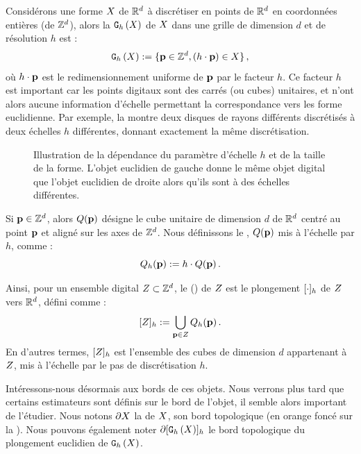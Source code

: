 Considérons une forme $X$ de $\mathbb{R}^d$ à discrétiser en points de $\mathbb{R}^d$ en
coordonnées entières (\cad de $\mathbb{Z}^d$), alors la  $\mathtt{G}_{h}\left(X\right)$ de $X$ dans une grille de dimension $d$ et de résolution $h$
est :
%
\begin{equation}
  \mathtt{G}_{h}\left(X\right) := \{ \mathbf{p} \in \mathbb{Z}^d, (h \cdot \mathbf{p}) \in X \} \,,
\end{equation}
%
où $h \cdot \mathbf{p}$ est le redimensionnement uniforme de $\mathbf{p}$ par le facteur $h$.
Ce facteur $h$ est important car les points digitaux sont des carrés (ou cubes)
unitaires, et n'ont alors aucune information d'échelle permettant la
correspondance vers les forme euclidienne. Par exemple, la
 montre deux disques de rayons différents
discrétisés à deux échelles $h$ différentes, donnant exactement la même
discrétisation.


\begin{figure}[ht]
  \begin{center}
    
  \end{center}
  \caption[Illustration de la dépendance du paramètre d'échelle $h$.]
  {Illustration de la dépendance du paramètre d'échelle $h$ et de la taille de
  la forme. L'objet euclidien de gauche donne le même objet digital que l'objet
  euclidien de droite alors qu'ils sont à des échelles
  différentes.\label{fig:scale-digital}}
\end{figure}

Si $\mathbf{p} \in \mathbb{Z}^d$, alors $Q({\mathbf{p}})$ désigne le cube unitaire de dimension $d$ de
$\mathbb{R}^d$ centré au point $\mathbf{p}$ et aligné sur les axes de $\mathbb{Z}^d$. Nous définissons
le , \cad $Q({\mathbf{p}})$ mis à l'échelle par $h$, comme :
%
\begin{equation}
  Q_{h}({\mathbf{p}}) := h\cdot Q({\mathbf{p}}) \,.
\end{equation}


Ainsi, pour un ensemble digital $Z \subset \mathbb{Z}^d$, le
 () de $Z$ est le
plongement $\lbrack \cdot \rbrack_{h}$ de $Z$ vers $\mathbb{R}^d$, défini comme :
%
\begin{equation}
  \lbrack Z \rbrack_{h} := \bigcup_{\mathbf{p} \in Z} Q_{h}({\mathbf{p}}) \,.
\end{equation}
%
En d'autres termes, $\lbrack Z \rbrack_{h}$ est l'ensemble des cubes de dimension
$d$ appartenant à $Z$, mis à l'échelle par le pas de discrétisation $h$.


Intéressons-nous désormais aux bords de ces objets. Nous verrons plus tard que
certains estimateurs sont définis sur le bord de l'objet, il semble alors
important de l'étudier. Nous notons $\partial X$ la  de $X$,
\cad son bord topologique (en orange foncé sur la ).
Nous pouvons également noter $\partial \lbrack \mathtt{G}_{h}\left(X\right) \rbrack_{h}$ le bord topologique du
plongement euclidien de $\mathtt{G}_{h}\left(X\right)$.
%
%



